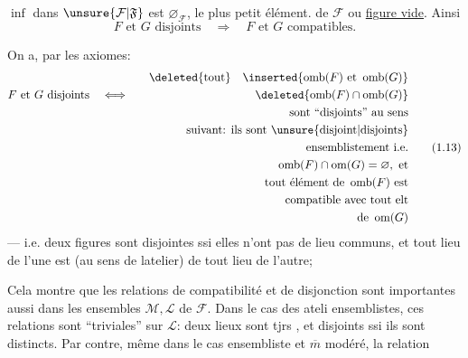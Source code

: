 $\inf$ dans $\unsure{\mathcal{F}|\mathfrak{F}}$ est $\varnothing_{\mathcal{F}}$, le plus petit élément. de $\mathcal{F}$ ou \uline{figure vide}. Ainsi
\[
F\text{ et }G\text{ disjoints}\quad\Longrightarrow\quad F\text{ et }G\text{ compatibles}.
\]

On a, par les axiomes:
\[
\begin{aligned}
&&\text{\deleted{tout}}\quad\inserted{\operatorname{omb}(F)\text{ et }\operatorname{omb}(G)}\\
F\text{ et }G\text{ disjoints}&\quad\Longleftrightarrow\quad&\deleted{\operatorname{omb}(F)\cap\operatorname{omb}(G)}\\
&&\text{sont ``disjoints'' au sens}\\
&&\text{suivant: ils sont \unsure{disjoint|disjoints}}\\
&&\text{ensemblistement i.e.}\\
&&\operatorname{omb}(F)\cap\operatorname{om}(G)=\varnothing,\ \text{et}\\
&&\text{tout élément de }\operatorname{omb}(F)\text{ est}\\
&&\text{compatible avec tout elt}\\
&&\text{de }\operatorname{om}(G)
\end{aligned}\tag*{(1.13)}
\]
--- i.e. deux figures sont disjointes ssi elles n'ont pas de lieu communs, et tout lieu de l'une est   (au sens de latelier) de tout lieu de l'autre;

Cela montre que les relations de compatibilité et de disjonction sont importantes aussi dans les  ensembles $\mathcal{M},\mathcal{L}$ de $\mathcal{F}$. Dans le cas des ateli ensemblistes, ces relations sont ``triviales'' sur $\mathcal{L}$: deux lieux sont tjrs  , et disjoints ssi ils sont distincts. Par contre, même dans le cas ensembliste et $\overline m$ modéré, la relation
